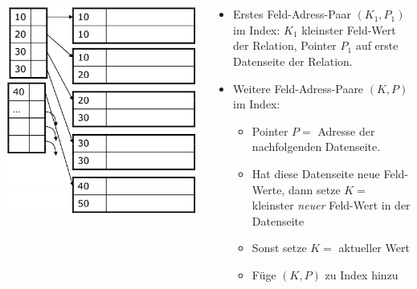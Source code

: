 \begin{frame}{\insertsection}
\framesubtitle{\insertsubsection}
\\[4pt]
\begin{columns}[T]
\begin{column}{.33\textwidth}
\includegraphics[scale=0.23]{img/Index_NonKey_Primary-Simple-3.png}
\end{column}
\begin{column}{.67\textwidth}
\begin{itemize}
	\item Erstes Feld-Adress-Paar $(K_1,P_1)$ im Index: $K_1$ kleinster Feld-Wert der Relation, Pointer $P_1$ auf erste Datenseite
	der Relation.
	\item Weitere Feld-Adress-Paare $(K,P)$ im Index: 
	\begin{itemize}
		\item Pointer $P =$ Adresse der nachfolgenden Datenseite. 
		\item Hat diese Datenseite neue Feld-Werte, dann setze $K =$ kleinster \textit{neuer} Feld-Wert in der Datenseite
		\item Sonst setze $K =$ aktueller Wert
		\item F\"uge $(K,P)$ zu Index hinzu
	\end{itemize}
\end{itemize}
%	
\end{column}
\end{columns}
\end{frame}

